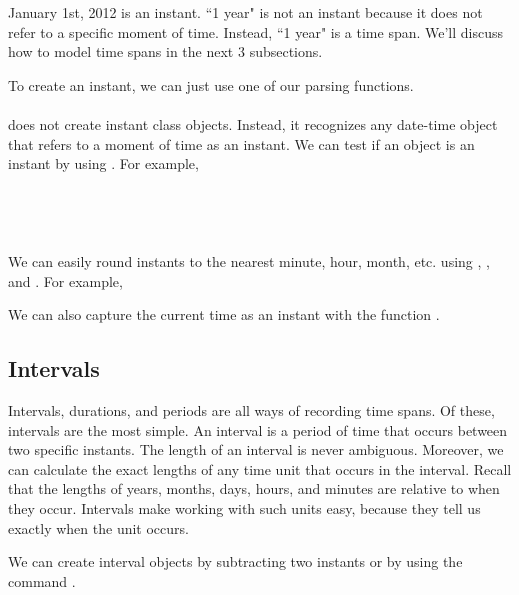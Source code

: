 \documentclass[article]{jss}
\begin{document}
January 1st, 2012 is an instant. ``1 year" is not an instant because it does not refer to a specific moment of time. Instead, ``1 year" is a time span. We'll discuss how to model time spans in the next 3 subsections.

To create an instant, we can just use one of our  parsing functions.\\ 

\\

 does not create instant class objects. Instead, it recognizes any date-time object that refers to a moment of time as an instant. We can test if an object is an instant by using . For example,\\

\\
\\

\\
\\

We can easily round instants to the nearest minute, hour, month, etc. using , , and . For example,


We can also capture the current time as an instant with the function .



\subsection{Intervals}
\label{sec:intervals}

Intervals, durations, and periods are all ways of recording time spans. Of these, intervals are the most simple. An interval is a period of time that occurs between two specific instants. The length of an interval is never ambiguous. Moreover, we can calculate the exact lengths of any time unit that occurs in the interval. Recall that the lengths of years, months, days, hours, and minutes are relative to when they occur. Intervals make working with such units easy, because they tell us exactly when the unit occurs. 

We can create interval objects by subtracting two instants or by using the command .\\
\end{document}
